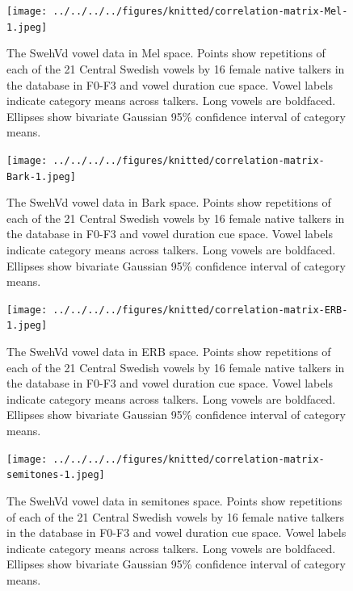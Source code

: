 \documentclass[utf8]{frontiers_suppmat} %
\begin{document}
\begin{figure}[H]
\texttt{[image: ../../../../figures/knitted/correlation-matrix-Mel-1.jpeg]} \caption{The SwehVd vowel data in Mel space. Points show repetitions of each of the 21 Central Swedish vowels by 16 female native talkers in the database in F0-F3 and vowel duration cue space. Vowel labels indicate category means across talkers. Long vowels are boldfaced. Ellipses show bivariate Gaussian 95\% confidence interval of category means.}\label{fig:correlation-matrix-Mel}
\end{figure}



\begin{figure}[H]
\texttt{[image: ../../../../figures/knitted/correlation-matrix-Bark-1.jpeg]} \caption{The SwehVd vowel data in Bark space. Points show repetitions of each of the 21 Central Swedish vowels by 16 female native talkers in the database in F0-F3 and vowel duration cue space. Vowel labels indicate category means across talkers. Long vowels are boldfaced. Ellipses show bivariate Gaussian 95\% confidence interval of category means.}\label{fig:correlation-matrix-Bark}
\end{figure}



\begin{figure}[H]
\texttt{[image: ../../../../figures/knitted/correlation-matrix-ERB-1.jpeg]} \caption{The SwehVd vowel data in ERB space. Points show repetitions of each of the 21 Central Swedish vowels by 16 female native talkers in the database in F0-F3 and vowel duration cue space. Vowel labels indicate category means across talkers. Long vowels are boldfaced. Ellipses show bivariate Gaussian 95\% confidence interval of category means.}\label{fig:correlation-matrix-ERB}
\end{figure}



\begin{figure}[H]
\texttt{[image: ../../../../figures/knitted/correlation-matrix-semitones-1.jpeg]} \caption{The SwehVd vowel data in semitones space. Points show repetitions of each of the 21 Central Swedish vowels by 16 female native talkers in the database in F0-F3 and vowel duration cue space. Vowel labels indicate category means across talkers. Long vowels are boldfaced. Ellipses show bivariate Gaussian 95\% confidence interval of category means.}\label{fig:correlation-matrix-semitones}
\end{figure}
\end{document}
